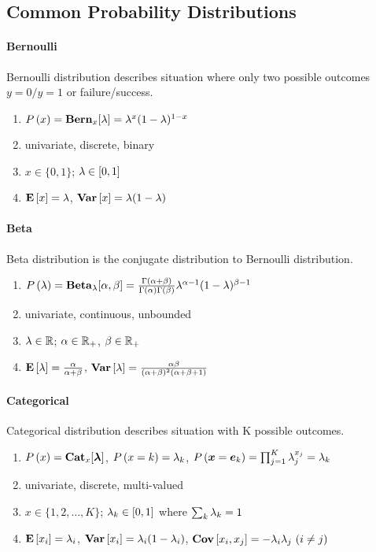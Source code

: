 \subsection{Common Probability Distributions}

\paragraph{Bernoulli}

Bernoulli distribution describes situation where only two possible outcomes $y=0 / y=1$ or failure/success.
\begin{enumerate}
	\item $P\left(x\right)=\mathbf{Bern}_x[\lambda]=\lambda^x(1-\lambda)^{1-x}$
	\item univariate, discrete, binary
	\item $x \in \{0,1\}$; $\lambda \in [0,1]$
	\item $\mathbf{E}\left[x\right]=\lambda$, $\mathbf{Var}\left[x\right]=\lambda(1-\lambda)$
\end{enumerate}

\paragraph{Beta}

Beta distribution is the conjugate distribution to Bernoulli distribution.
\begin{enumerate}
	\item $P\left(\lambda\right)=\mathbf{Beta}_\lambda[\alpha,\beta]=\frac{\Gamma(\alpha+\beta)}{\Gamma(\alpha)\Gamma(\beta)}\lambda^{\alpha-1}(1-\lambda)^{\beta-1}$
	\item univariate, continuous, unbounded
	\item $\lambda \in \mathbb{R}$; $\alpha \in \mathbb{R}_+$,  $\beta \in \mathbb{R}_+$
	\item $\mathbf{E}\left[\lambda\right]=\frac{\alpha}{\alpha+\beta}$, $\mathbf{Var}\left[\lambda\right]=\frac{\alpha\beta}{(\alpha+\beta)^2(\alpha+\beta+1)}$
\end{enumerate}

\paragraph{Categorical}

Categorical distribution describes situation with K possible outcomes.
\begin{enumerate}
	\item $P\left(x\right)=\mathbf{Cat}_x[\boldsymbol{\lambda}]$, $P\left(x=k\right)=\lambda_k$,  $P\left(\boldsymbol{x}=\boldsymbol{e}_k\right)=\prod_{j=1}^K\lambda_j^{x_j}=\lambda_k$
	\item univariate, discrete, multi-valued
	\item $x \in \{1,2,\dotsc,K\}$; $\lambda_k \in [0,1]$ where $\sum_k\lambda_k=1$
	\item $\mathbf{E}\left[x_i\right]=\lambda_i$, $\mathbf{Var}\left[x_i\right]=\lambda_i(1-\lambda_i)$, $\mathbf{Cov}\left[x_i,x_j\right]=-\lambda_i\lambda_j\ (i \neq j)$
\end{enumerate}

